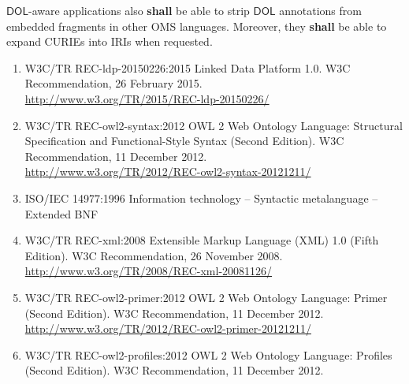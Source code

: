 \documentclass[10pt, a4paper]{isov2}
\newcommand*{\shall}{\textbf{shall}\xspace}
\newcommand*{\DOL}{\ensuremath{\mathsf{DOL}}\xspace}
\begin{document}
\DOL-aware applications also  \shall  be able to strip \DOL annotations
from embedded fragments in other OMS languages. Moreover, they  \shall 
be able to expand CURIEs into IRIs when requested.



\cleardoublepage
{}
\begin{enumerate}[label=\bfseries NR\arabic*]
  \item{W3C/TR REC-ldp-20150226:2015} {Linked Data Platform 1.0. W3C Recommendation, 26 February 2015.\\ \url{http://www.w3.org/TR/2015/REC-ldp-20150226/}}\label{nref-linked-data}
  \item{W3C/TR REC-owl2-syntax:2012} {OWL 2 Web Ontology Language: Structural Specification and Functional-Style Syntax (Second Edition). W3C Recommendation, 11 December 2012.\\ \url{http://www.w3.org/TR/2012/REC-owl2-syntax-20121211/}}\label{nref-OWL2}
  \item{ISO/IEC 14977:1996} {Information technology – Syntactic metalanguage – Extended BNF}\label{nref-EBNF}
  \item{W3C/TR REC-xml:2008} {Extensible Markup Language (XML) 1.0 (Fifth Edition). W3C Recommendation, 26 November 2008. \\
  \url{http://www.w3.org/TR/2008/REC-xml-20081126/}}\label{nref-XML}
  \item{W3C/TR REC-owl2-primer:2012} {OWL 2 Web Ontology Language: Primer (Second Edition). W3C Recommendation, 11 December 2012. \\
  \url{http://www.w3.org/TR/2012/REC-owl2-primer-20121211/}}\label{nref-OWL2-primer}
  \item{W3C/TR REC-owl2-profiles:2012} {OWL 2 Web Ontology Language: Profiles (Second Edition). W3C Recommendation, 11 December 2012. \\
}
\end{enumerate}
\end{document}
